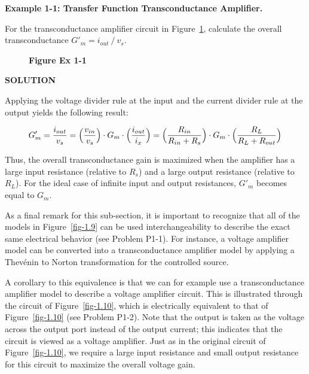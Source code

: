\documentclass[
  11pt,
  letterpaper,
  abstract]{scrbook}
\begin{document}
\textbf{Example 1-1: Transfer Function Transconductance Amplifier.}

For the transconductance amplifier circuit in Figure~\ref{fig-ex-1.1},
calculate the overall transconductance \(G'_m = i_{out} ⁄ v_s\).

\begin{figure}


\caption{\label{fig-ex-1.1}\textbf{Figure Ex 1-1}}

\end{figure}%

\textbf{SOLUTION}

Applying the voltage divider rule at the input and the current divider
rule at the output yields the following result:

\[
G'_m = \frac{i_{out}}{v_s} = \Bigl(\frac{v_{in}}{v_s}\Bigr) \cdot G_m \cdot \Bigl(\frac{i_{out}}{i_x}\Bigr) =  \Bigl(\frac{R_{in}}{R_{in} + R_s}\Bigr) \cdot G_m \cdot \Bigl(\frac{R_{L}}{R_{L} + R_{out}}\Bigr)
\]

Thus, the overall transconductance gain is maximized when the amplifier
has a large input resistance (relative to \(R_s\)) and a large output
resistance (relative to \(R_L\)). For the ideal case of infinite input
and output resistances, \(G'_m\) becomes equal to \(G_m\).

As a final remark for this sub-section, it is important to recognize
that all of the models in Figure~\ref{fig-1.9} can be used
interchangeability to describe the exact same electrical behavior (see
Problem P1-1). For instance, a voltage amplifier model can be converted
into a transconductance amplifier model by applying a Thevénin to Norton
transformation for the controlled source.

A corollary to this equivalence is that we can for example use a
transconductance amplifier model to describe a voltage amplifier
circuit. This is illustrated through the circuit of
Figure~\ref{fig-1.10}, which is electrically equivalent to that of
Figure~\ref{fig-1.10} (see Problem P1-2). Note that the output is taken
as the voltage across the output port instead of the output current;
this indicates that the circuit is viewed as a voltage amplifier. Just
as in the original circuit of Figure~\ref{fig-1.10}, we require a large
input resistance and small output resistance for this circuit to
maximize the overall voltage gain.
\end{document}
